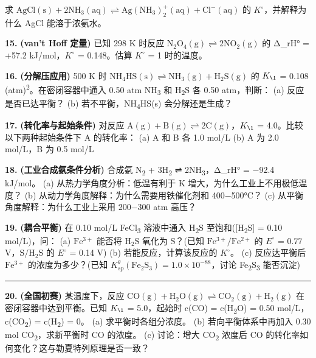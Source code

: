 \documentclass[a4paper,11pt]{ctexart}
\begin{document}
求 \(\mathrm{AgCl(s) + 2NH_3(aq) \rightleftharpoons Ag(NH_3)_2^+(aq) + Cl^-(aq)}\) 的 \(K^{\circ}\)，并解释为什么 AgCl 能溶于浓氨水。

\textbf{15.} \textbf{(van't Hoff 定量)} 已知 298 K 时反应 \(\mathrm{N_2O_4(g) \rightleftharpoons 2NO_2(g)}\) 的 Δ\_rH° = +57.2 kJ/mol，\(K^{\circ}\) = 0.148。估算 \(K^{\circ}\) = 1 时的温度。

\textbf{16.} \textbf{(分解压应用)} 500 K 时 \(\mathrm{NH_4HS(s) \rightleftharpoons NH_3(g) + H_2S(g)}\) 的 \(K_{\1}\) = 0.108 (atm)\textsuperscript{2}。在密闭容器中通入 0.50 atm NH\textsubscript{3} 和 H\textsubscript{2}S 各 0.50 atm，判断：
(a) 反应是否已达平衡？
(b) 若不平衡，NH\textsubscript{4}HS(s) 会分解还是生成？

\textbf{17.} \textbf{(转化率与起始条件)} 对反应 \(\mathrm{A(g) + B(g) \rightleftharpoons 2C(g)}\)，\(K_{\1}\) = 4.0。比较以下两种起始条件下 A 的转化率：
(a) A 和 B 各 1.0 mol/L
(b) A 为 2.0 mol/L，B 为 0.5 mol/L

\textbf{18.} \textbf{(工业合成氨条件分析)} 合成氨 N\textsubscript{2} + 3H\textsubscript{2} ⇌ 2NH\textsubscript{3}，Δ\_rH° = −92.4 kJ/mol。
(a) 从热力学角度分析：低温有利于 K 增大，为什么工业上不用极低温度？
(b) 从动力学角度解释：为什么需要用铁催化剂和 400−500°C？
(c) 从平衡角度解释：为什么工业上采用 200−300 atm 高压？

\textbf{19.} \textbf{(耦合平衡)} 在 0.10 mol/L FeCl\textsubscript{3} 溶液中通入 H\textsubscript{2}S 至饱和({[}H\textsubscript{2}S{]} = 0.10 mol/L)，问：
(a) \(\mathrm{Fe^{3+}}\) 能否将 \(\mathrm{H_2S}\) 氧化为 \(\mathrm{S}\)？(已知 \(\mathrm{Fe^{3+}/Fe^{2+}}\) 的 \(E^{\circ}\) = 0.77 V，\(\mathrm{S/H_2S}\) 的 \(E^{\circ}\) = 0.14 V)
(b) 若能反应，计算该反应的 \(K^{\circ}\)。
(c) 反应达平衡后 \(\mathrm{Fe^{3+}}\) 的浓度为多少？(已知 \(K_{sp}^\theta(\mathrm{Fe_2S_3}) = 1.0 \times 10^{-88}\)，讨论 Fe\textsubscript{2}S\textsubscript{3} 能否沉淀)

\begin{center}\rule{0.5\linewidth}{0.5pt}\end{center}

\textbf{20.} \textbf{(全国初赛)} 某温度下，反应 \(\mathrm{CO(g) + H_2O(g) \rightleftharpoons CO_2(g) + H_2(g)}\) 在密闭容器中达到平衡。已知 \(K_{\1}\) = 5.0，起始时 c(CO) = c(H\textsubscript{2}O) = 0.50 mol/L，c(CO\textsubscript{2}) = c(H\textsubscript{2}) = 0。
(a) 求平衡时各组分浓度。
(b) 若向平衡体系中再加入 0.30 mol CO\textsubscript{2}，求新平衡时 CO 的浓度。
(c) 讨论：增大 CO\textsubscript{2} 浓度后 CO 的转化率如何变化？这与勒夏特列原理是否一致？
\end{document}

